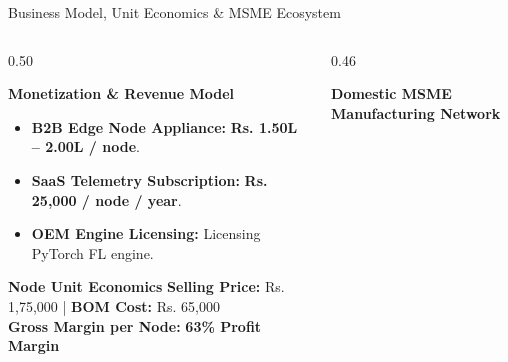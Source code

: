 \documentclass[aspectratio=169, 11pt]{beamer}
\begin{document}
\begin{frame}{Business Model, Unit Economics \& MSME Ecosystem}
    \begin{columns}[c]
        \begin{column}{0.50\textwidth}
            \begin{block}{\textcolor{neonCyan}{\textbf{Monetization \& Revenue Model}}}
                \tiny
                \begin{itemize}
                    \item \textbf{B2B Edge Node Appliance:} \textbf{Rs. 1.50L -- 2.00L / node}.
                    \item \textbf{SaaS Telemetry Subscription:} \textbf{Rs. 25,000 / node / year}.
                    \item \textbf{OEM Engine Licensing:} Licensing PyTorch FL engine.
                \end{itemize}
            \end{block}
            
            \begin{block}{\textcolor{neonTeal}{\textbf{Node Unit Economics}}}
                \tiny
                \textbf{Selling Price:} Rs. 1,75,000 \quad | \quad \textbf{BOM Cost:} Rs. 65,000 \\
                \textbf{Gross Margin per Node:} \textbf{\textcolor{neonTeal}{63\% Profit Margin}}
            \end{block}
        \end{column}
        
        \begin{column}{0.46\textwidth}
            \begin{block}{\textcolor{neonAmber}{\textbf{Domestic MSME Manufacturing Network}}}
                \centering
                \vspace{0.2cm}
\end{block}
\end{column}
\end{columns}
\end{frame}
\end{document}
